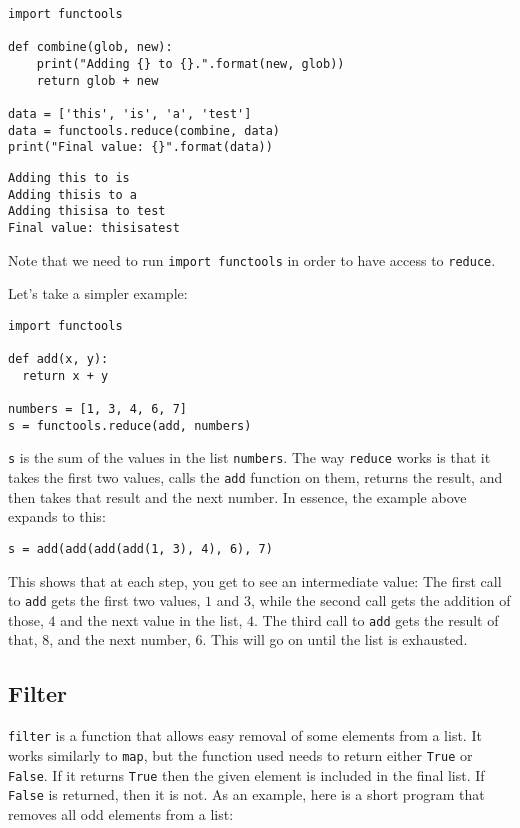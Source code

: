 \documentclass[11pt]{cselabheader}
\begin{document}
\begin{lstlisting}[style=python]
import functools

def combine(glob, new):
    print("Adding {} to {}.".format(new, glob))
    return glob + new

data = ['this', 'is', 'a', 'test']
data = functools.reduce(combine, data)
print("Final value: {}".format(data))
\end{lstlisting}

\begin{lstlisting}
Adding this to is
Adding thisis to a
Adding thisisa to test
Final value: thisisatest
\end{lstlisting}

Note that we need to run \lstinline{import functools} in order to have access to
\lstinline{reduce}.

Let's take a simpler example:
\begin{lstlisting}
import functools

def add(x, y):
  return x + y

numbers = [1, 3, 4, 6, 7]
s = functools.reduce(add, numbers)
\end{lstlisting}

\lstinline!s! is the sum of the values in the list \lstinline!numbers!. The way
\lstinline!reduce! works is that it takes the first two values, calls the
\lstinline!add! function on them, returns the result, and then takes that result
and the next number. In essence, the example above expands to this:
\begin{lstlisting}
s = add(add(add(add(1, 3), 4), 6), 7)
\end{lstlisting}

This shows that at each step, you get to see an intermediate value: The first
call to \lstinline!add! gets the first two values, $1$ and $3$, while the second
call gets the addition of those, $4$ and the next value in the list, $4$. The
third call to \lstinline!add! gets the result of that, $8$, and the next number,
$6$. This will go on until the list is exhausted.

\subsection{Filter}
\label{subsec:filter}
\lstinline{filter} is a function that allows easy removal of some elements from
a list. It works similarly to \lstinline{map}, but the function used needs to
return either \lstinline{True} or \lstinline{False}. If it returns
\lstinline{True} then the given element is included in the final list. If
\lstinline{False} is returned, then it is not. As an example, here is a short
program that removes all odd elements from a list:
\end{document}
